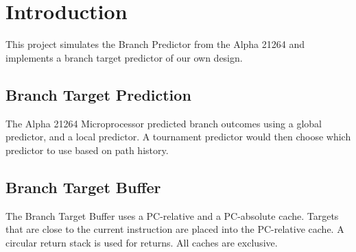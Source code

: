 \section{Introduction}
This project simulates the Branch Predictor from the Alpha 21264 and implements a branch target predictor of our own design.

\subsection{Branch Target Prediction}
The Alpha 21264 Microprocessor predicted branch outcomes using a global predictor, and a local predictor. A tournament predictor would then choose which predictor to use based on path history.

\subsection{Branch Target Buffer}
The Branch Target Buffer uses a PC-relative and a PC-absolute cache. Targets that are close to the current instruction are placed into the PC-relative cache. A circular return stack is used for returns. All caches are exclusive.
